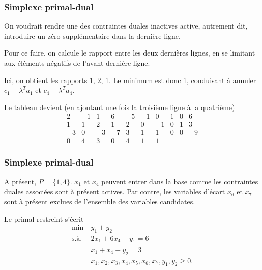 \documentclass[t,usepdftitle=false]{beamer}
\begin{document}
\begin{frame}
\frametitle{Simplexe primal-dual}

On voudrait rendre une des contraintes duales inactives active, autrement dit, introduire un zéro supplémentaire dans la dernière ligne.

\mbox{}

Pour ce faire, on calcule le rapport entre les deux dernières lignes, en se limitant aux éléments négatifs de l'avant-dernière ligne.

\mbox{}

Ici, on obtient les rapports 1, 2, 1. Le minimum est donc 1, conduisant à annuler $c_1 - \lambda^T a_1$ et $c_4 - \lambda^T a_4$.

\mbox{}

Le tableau devient (en ajoutant une fois la troisième ligne à la quatrième)
\[
\begin{matrix}
2 & -1 & 1 & 6 & -5 & -1 & 0 & 1 & 0 & 6 \\
1 & 1 & 2 & 1 & 2 & 0 & -1 & 0 & 1 & 3 \\
-3 & 0 & -3 & -7 & 3 & 1 & 1 & 0 & 0 & -9 \\
0 & 4 & 3 & 0 & 4 & 1 & 1
\end{matrix}
\]

\end{frame}

\begin{frame}
\frametitle{Simplexe primal-dual}

A présent, $P = \lbrace 1, 4 \rbrace$. $x_1$ et $x_4$ peuvent entrer dans la base comme les contraintes duales associées sont à présent actives. Par contre, les variables d'écart $x_6$ et $x_7$ sont à présent exclues de l'ensemble des variables candidates.

\mbox{}

Le primal restreint s'écrit
\begin{align*}
\min\ & y_1 + y_2 \\
\mbox{s.à. } & 2x_1 + 6x_4 + y_1 = 6 \\
& x_1 + x_4 + y_2 = 3 \\
& x_1, x_2, x_3, x_4, x_5, x_6, x_7, y_1, y_2 \geq 0.
\end{align*}

\end{frame}
\end{document}
